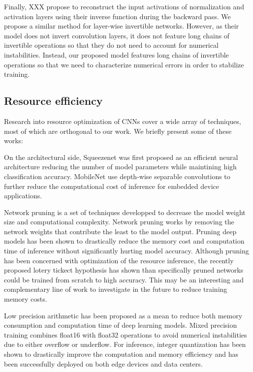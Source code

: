 \documentclass[twocolumn]{bmcart}
\begin{document}
Finally, XXX propose to reconstruct the input activations of normalization and activation layers using their inverse function during the backward pass.
We propose a similar method for layer-wise invertible networks. 
However, as their model does not invert convolution layers, 
it does not feature long chains of invertible operations so that they do not  need to account for numerical instabilities.
Instead, our proposed model features long chains of invertible operations so that we need to characterize numerical errors in order to stabilize training.

\subsection{Resource efficiency}

Research into resource optimization of CNNs cover a wide array of techniques, most of which are orthogonal to our work. We briefly present some of these works:

On the architectural side, Squeezenet was first proposed as an efficient neural architecture reducing the number of model parameters while maintining high classification accuracy.
MobileNet use depth-wise separable convolutions to further reduce the computational cost of inference for embedded device applications.

Network pruning is a set of techniques \cite{} developped to decrease the model weight size and computational complexity.
Network pruning works by removing the network weights that contribute the least to the model output.
Pruning deep models has been shown to drastically reduce the memory cost and computation time of inference without  significantly hurting model accuracy.
Although pruning has been concerned with optimization of the resource inference, the recently proposed lotery tickect hypothesis \cite{} has shown than specifically pruned networks could  be trained from scratch to high accuracy. 
This may be an interesting and complementary line of work to investigate in the future to reduce training memory costs.

Low precision arithmetic has been proposed as a mean to reduce both memory consumption and computation time of deep learning models. Mixed precision training \cite{} combines float16 with float32 operations to avoid numerical instabilities due to either overflow or underflow.
For inference,  integer quantization \cite{} has been shown to drastically improve the computation and memory efficiency and has been successfully deployed on both edge devices and data centers.
\end{document}

